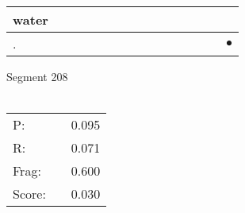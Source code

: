 \documentclass[landscape]{article}
\newcommand{\ssp}{\hspace{2pt}}
\newcommand{\mex}{\cellcolor{g}$\bullet$}
\begin{document}
\begin{tabular}{|l|p{10pt}|p{10pt}|p{10pt}|p{10pt}|p{10pt}|p{10pt}|p{10pt}|p{10pt}|p{10pt}|p{10pt}|p{10pt}|p{10pt}|p{10pt}|p{10pt}|}
\hline
\ssp water \ssp&\hspace{2pt}&\hspace{2pt}&\hspace{2pt}&\hspace{2pt}&\hspace{2pt}&\hspace{2pt}&\hspace{2pt}&\hspace{2pt}&\hspace{2pt}&\hspace{2pt}&\hspace{2pt}&\hspace{2pt}&\hspace{2pt}&\hspace{2pt}\\
\hline
\ssp \cellcolor{ref13}. \ssp&\hspace{2pt}&\hspace{2pt}&\hspace{2pt}&\hspace{2pt}&\hspace{2pt}&\hspace{2pt}&\hspace{2pt}&\hspace{2pt}&\hspace{2pt}&\hspace{2pt}&\hspace{2pt}&\hspace{2pt}&\hspace{2pt}&\hspace{2pt}\mex\\
\hline
\end{tabular}

\vspace{6pt}
\noindent Segment 208\\\\
\noindent\begin{tabular}{lm{12pt}r}
\hline
P:&&0.095\\
R:&&0.071\\
Frag:&&0.600\\
Score:&&0.030\\
\end{tabular}

\newpage
\end{document}
